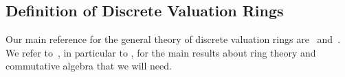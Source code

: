 \documentclass[sigplan,10pt,anonymous,review]{acmart}
\begin{document}
\subsection{Definition of Discrete Valuation Rings}\label{subsection:def_dvr}
Our main reference for the general theory of discrete valuation rings are~\cite{Ser62} and~\cite[Chapitre~VI]{Bou85}. We refer to~\cite{Bou07}, in particular to \cite[Chapitre~IV]{Bou07}, for the main results about ring theory and commutative algebra that we will need.
\end{document}
